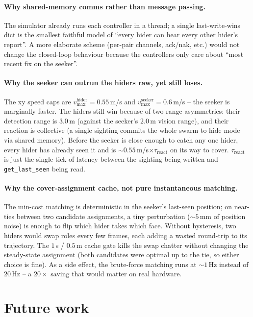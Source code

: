 \documentclass[11pt,a4paper]{article}
\newcommand{\code}[1]{\texttt{#1}}
\begin{document}
\paragraph{Why shared-memory comms rather than message passing.}
The simulator already runs each controller in a thread; a single
last-write-wins dict is the smallest faithful model of ``every hider can hear
every other hider's report''. A more elaborate scheme (per-pair channels,
ack/nak, etc.) would not change the closed-loop behaviour because the
controllers only care about ``most recent fix on the seeker''.

\paragraph{Why the seeker can outrun the hiders raw, yet still loses.}
The xy speed caps are $v_\mathrm{max}^\mathrm{hider} = 0.55$\,m/s and
$v_\mathrm{max}^\mathrm{seeker} = 0.6$\,m/s -- the seeker is marginally
faster. The hiders still win because of two range asymmetries: their
detection range is $3.0$\,m (against the seeker's $2.0$\,m vision range),
and their reaction is collective (a single sighting commits the whole
swarm to hide mode via shared memory). Before the seeker is close enough
to catch any one hider, every hider has already seen it and is
$\sim 0.55$\,m/s$\times \tau_\mathrm{react}$ on its way to cover.
$\tau_\mathrm{react}$ is just the single tick of latency between the
sighting being written and \code{get\_last\_seen} being read.

\paragraph{Why the cover-assignment cache, not pure instantaneous matching.}
The min-cost matching is deterministic in the seeker's last-seen position;
on near-ties between two candidate assignments, a tiny perturbation
($\sim 5$\,mm of position noise) is enough to flip which hider takes which
face. Without hysteresis, two hiders would swap roles every few frames,
each adding a wasted round-trip to its trajectory. The
$1$\,s / $0.5$\,m cache gate kills the swap chatter without changing the
steady-state assignment (both candidates were optimal up to the tie, so
either choice is fine). As a side effect, the brute-force matching runs
at $\sim 1$\,Hz instead of $20$\,Hz -- a $20\times$ saving that would
matter on real hardware.

\section{Future work}
\end{document}
